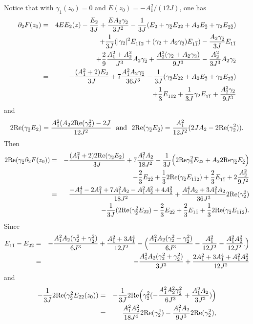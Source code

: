 \documentclass[12pt]{amsart}
\def\1bar{\overline{1}}
\def\d{\partial}
\def\d{\partial}
\begin{document}
Notice that with $\gamma_1(z_0)=0$ and $E(z_0)=-A_1^2/(12J)$, one has
\begin{eqnarray*}
\d_2 F(z_0)&=&4E E_2(z)-{E_2\over 3J}+{E A_2 \gamma_{\bar2}\over 3J^2}-{1\over 3J} (E_2+\gamma_{\bar2} E_{22}+A_2 E_{\bar2}+\gamma_{2} E_{2\bar2})\\
&&+{1\over 3J} (|\gamma_2|^2 E_{1\bar1 2}+(\gamma_2+A_2 \gamma_{\bar2})E_{1\1bar})- {A_2 \gamma_{\bar2} \over 3J} E_{1\bar1}\\
&&+{2\over 9} {A_1^2+A_2^2\over J^3} A_2 \gamma_{\bar2}
+{A_2^2(\gamma_2+A_2 \gamma_{\bar2} )\over 9J^3} -{A_2^2  \over 3 J^3} A_2 \gamma_{\bar2}\\
&=&-{(A_1^2+2) E_2\over 3 J}+7 {A_1^2  A_2 \gamma_{\bar2}\over 36 J^3}-{1\over 3J} (\gamma_{\bar2} E_{22}+A_2 E_{\bar2}+\gamma_{2} E_{2\bar2})\\
&&+{1\over 3} E_{1\bar1 2}+{1\over 3J} \gamma_2E_{1\1bar}
+{A_2^2 \gamma_2\over 9J^3}
\end{eqnarray*}
and
$$
2\hbox{Re}(\gamma_{\bar2} E_2)={A_1^2(A_2 2\hbox{Re}(\gamma_2^2)-2J \over 12 J^2}\  \hbox{ and } \ 2\hbox{Re}(\gamma_{\bar2} E_{\bar2})={A_1^2\over 12 J^2} (2J A_2-2\hbox{Re}(\gamma_2^2)).
$$
Then
\begin{eqnarray*}
2\hbox{Re}(\gamma_{\bar2}  \d_2 F(z_0))
&=&-{(A_1^2+2)  2\hbox{Re} (\gamma_{\bar2} E_2)\over 3 J}+7 {A_1^2  A_2 \over 18 J^2}
-{1\over 3J } \Big( 2\hbox{Re} \gamma_{\bar2}^2 E_{22}+A_2 2\hbox{Re} \gamma_{\bar2} E_{\bar2}\Big)\\
&&-{2\over 3}  E_{2\bar2}+{1\over 3} 2\hbox{Re} (\gamma_{\bar2}  E_{1\bar1 2})+{2\over 3}E_{1\1bar}
+2{A_2^2\over 9J^2} \\
&=&{-A_1^4-2A_1^2 +7A_1^2A_2-A_1^2A_2^2+4A_2^2 \over 18 J^2} +{A_1^4A_2+3A_1^2A_2\over 36 J^3} 2\hbox{Re}(\gamma_2^2)\\
&&-{1\over 3J} (2\hbox{Re}(\gamma_{\bar2}^2 E_{22})-{2\over 3} E_{2\bar2} +{2\over 3} E_{1\bar1}+{1\over 3} 2\hbox{Re} (\gamma_{\bar2}  E_{1\bar1 2}).
\end{eqnarray*}
Since
\begin{eqnarray*}
E_{1\bar1}-E_{2\bar2}
&=&-{A_1^2 A_2(\gamma_2^2+\gamma_{\bar2}^2)\over 6 J^3}+{A_1^2 +3A_1^4\over 12 J^2}
-\Big({ A_1^2 A_2 (\gamma_2^2+ \gamma_{\bar2}^2 ) \over 6 J^3}
-{ A_1^2  \over 12 J^2}
-{A_1^2  A_2^2 \over 12 J^2}.\Big)\\
&=&-{A_1^2 A_2(\gamma_2^2+\gamma_{\bar2}^2)\over 3 J^3}+{2A_1^2 +3A_1^4 +A_1^2A_2^2\over 12 J^2}
\\
\end{eqnarray*}
and 
\begin{eqnarray*}
-{1\over 3J} 2\hbox{Re} (\gamma_{\bar2}^2 E_{22}(z_0))&=&-{1\over 3J} 2 \hbox{Re} \Big(\gamma_{\bar2}^2(-{A_1^2 A_2^2 \gamma_{\bar2}^2 \over 6 J^3}+{A_1^2A_2 \over 3 J^2})\Big)\\
&=& {A_1^2 A_2^2  \over 18 J^4} 2\hbox{Re}(\gamma_2^4) -{A_1^2A_2 \over 9 J^3} 2\hbox{Re}(\gamma_2^2),
\end{eqnarray*}
\end{document}
